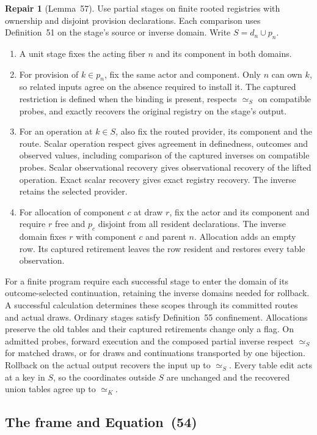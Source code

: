 \documentclass[11pt,a4paper]{article}
\theoremstyle{definition}
\newtheorem{repair}[definition]{Repair}
\theoremstyle{plain}
\begin{document}
\begin{repair}[Lemma~57]
Use partial stages on finite rooted registries with ownership and disjoint provision declarations. Each comparison uses Definition~51 on the stage's source or inverse domain. Write $S=d_n\cup p_n$.
\begin{enumerate}
\item A unit stage fixes the acting fiber $n$ and its component in both domains.
\item For provision of $k\in p_n$, fix the same actor and component. Only $n$ can own $k$, so related inputs agree on the absence required to install it. The captured restriction is defined when the binding is present, respects $\simeq_S$ on compatible probes, and exactly recovers the original registry on the stage's output.
\item For an operation at $k\in S$, also fix the routed provider, its component and the route. Scalar operation respect gives agreement in definedness, outcomes and observed values, including comparison of the captured inverses on compatible probes. Scalar observational recovery gives observational recovery of the lifted operation. Exact scalar recovery gives exact registry recovery. The inverse retains the selected provider.
\item For allocation of component $c$ at draw $r$, fix the actor and its component and require $r$ free and $p_c$ disjoint from all resident declarations. The inverse domain fixes $r$ with component $c$ and parent $n$. Allocation adds an empty row. Its captured retirement leaves the row resident and restores every table observation.
\end{enumerate}
For a finite program require each successful stage to enter the domain of its outcome-selected continuation, retaining the inverse domains needed for rollback. A successful calculation determines these scopes through its committed routes and actual draws.
Ordinary stages satisfy Definition~55 confinement. Allocations preserve the old tables and their captured retirements change only a flag. On admitted probes, forward execution and the composed partial inverse respect $\simeq_S$ for matched draws, or for draws and continuations transported by one bijection. Rollback on the actual output recovers the input up to $\simeq_S$. Every table edit acts at a key in $S$, so the coordinates outside $S$ are unchanged and the recovered union tables agree up to $\simeq_K$.
\end{repair}

\subsection{The frame and Equation~(54)}
\label{sec:frame-eq54}
\end{document}
